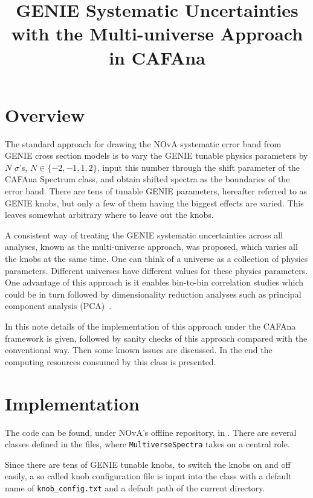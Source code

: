 \documentclass[12pt,a4paper,final]{iopart}
\begin{document}
\title{GENIE Systematic Uncertainties with the Multi-universe Approach in CAFAna}

\section{Overview}
The standard approach for drawing the NOvA systematic error band from GENIE cross section models is to vary the GENIE tunable physics parameters by $N$ $\sigma$'s, $N\in\{-2,-1,1,2\}$, input this number through the shift parameter of the CAFAna Spectrum class, and obtain shifted spectra as the boundaries of the error band. There are tens of tunable GENIE parameters, hereafter referred to as GENIE knobs, but only a few of them having the biggest effects are varied. This leaves somewhat arbitrary where to leave out the knobs.

A consistent way of treating the GENIE systematic uncertainties across all analyses, known as the multi-universe approach, was proposed, which varies all the knobs at the same time. One can think of a universe as a collection of physics parameters. Different universes have different values for these physics parameters. One advantage of this approach is it enables bin-to-bin correlation studies which could be in turn followed by dimensionality reduction analyses such as principal component analysis (PCA)~\cite{ref1}.

In this note details of the implementation of this approach under the CAFAna framework is given, followed by sanity checks of this approach compared with the conventional way. Then some known issues are discussed. In the end the computing resources consumed by this class is presented.

\section{Implementation}
The code can be found, under NOvA's offline repository, in . There are several classes defined in the files, where \texttt{MultiverseSpectra} takes on a central role.

Since there are tens of GENIE tunable knobs, to switch the knobs on and off easily, a so called knob configuration file is input into the class with a default name of \texttt{knob\_config.txt} and a default path of the current directory.
\end{document}

